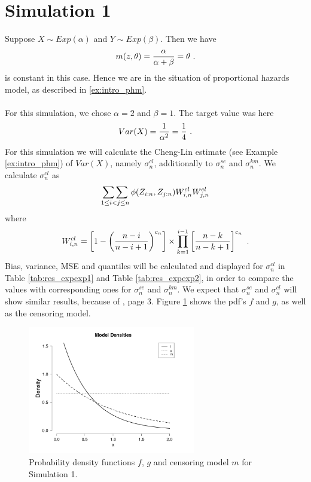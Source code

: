 \section{Simulation 1} \label{sec:sim_expexp}
Suppose $X \sim Exp(\alpha)$ and $Y\sim Exp(\beta)$. Then we have
$$m(z,\theta) = \frac{\alpha}{\alpha + \beta} = \theta\textrm{ .}$$
is constant in this case. Hence we are in the situation of proportional hazards model, as described in \ref{ex:intro_phm}.\\
\\
For this simulation, we chose $\alpha = 2$ and $\beta = 1$. The target value was here
$$Var(X) = \frac{1}{\alpha^2}=\frac{1}{4}\textrm{ .}$$
For this simulation we will calculate the Cheng-Lin estimate (see Example \ref{ex:intro_phm}) of $Var(X)$, namely $\sigma_n^{cl}$, additionally to $\sigma_n^{se}$ and $\sigma_n^{km}$. We calculate  $\sigma_n^{cl}$ as
$$\mathop{\sum\sum}\limits_{1\leq i < j \leq n} \phi(Z_{i:n}, Z_{j:n}) W_{i,n}^{cl} W_{j,n}^{cl}$$
where
$$W_{i,n}^{cl} = \left[1-\left(\frac{n-i}{n-i+1}\right)^{c_n}\right] \times \prod_{k=1}^{i-1}\left[\frac{n-k}{n-k+1}\right]^{c_n}\textrm{ .}$$
Bias, variance, MSE and quantiles will be calculated and displayed for $\sigma_n^{cl}$ in Table \ref{tab:res_expexp1} and Table \ref{tab:res_expexp2}, in order to compare the values with corresponding ones for $\sigma_n^{se}$ and $\sigma_n^{km}$. We expect that $\sigma_n^{se}$ and $\sigma_n^{cl}$ will show similar results, because of \cite{dikta2000strong}, page 3. Figure \ref{fig:dens_expexp} shows the pdf's $f$ and $g$, as well as the censoring model.
\begin{figure}[h!]
	\begin{center}
		\includegraphics[width=0.65\textwidth]{./figures/exp_exp_dens}
	\end{center}
	\caption{Probability density functions $f$, $g$ and censoring model $m$ for Simulation 1.}
	\label{fig:dens_expexp}
\end{figure}
